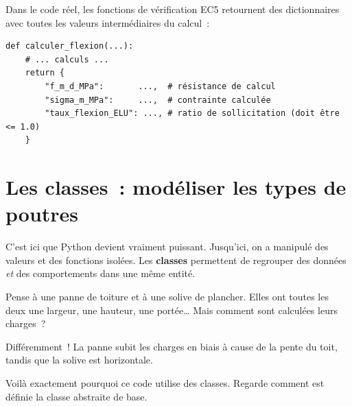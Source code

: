 \documentclass[12pt, a4paper, openany]{book}
\newcommand{\py}[1]{\texttt{#1}}
\begin{document}
Dans le code r\'eel, les fonctions de v\'erification EC5 retournent
des dictionnaires avec toutes les valeurs interm\'ediaires du calcul~:

\begin{lstlisting}[style=python, caption={Dictionnaire retourné par \py{calculer\_flexion()}}]
def calculer_flexion(...):
    # ... calculs ...
    return {
        "f_m_d_MPa":       ...,  # résistance de calcul
        "sigma_m_MPa":     ...,  # contrainte calculée
        "taux_flexion_ELU": ..., # ratio de sollicitation (doit être <= 1.0)
    }
\end{lstlisting}

\section{Les classes~: mod\'eliser les types de poutres}

C'est ici que Python devient vraiment puissant. Jusqu'ici, on a
manipul\'e des valeurs et des fonctions isol\'ees. Les \textbf{classes}
permettent de regrouper des donn\'ees \emph{et} des comportements dans
une m\^eme entit\'e.

\begin{maitre}
Pense \`a une panne de toiture et \`a une solive de plancher.
Elles ont toutes les deux une largeur, une hauteur, une port\'ee\ldots{}
Mais comment sont calcul\'ees leurs charges~?
\end{maitre}

\begin{apprenti}
Diff\'eremment~! La panne subit les charges en biais \`a cause de la
pente du toit, tandis que la solive est horizontale.
\end{apprenti}

\begin{maitre}
Voil\`a exactement pourquoi ce code utilise des classes.
Regarde comment est d\'efinie la classe abstraite de base.
\end{maitre}
\end{document}
